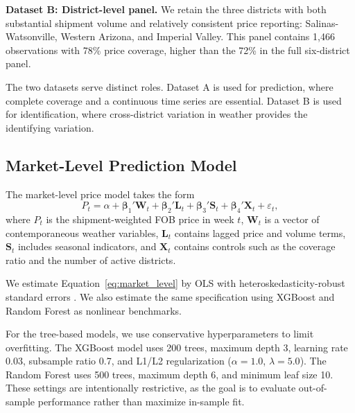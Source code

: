 \documentclass[12pt]{article}
\begin{document}
\textbf{Dataset B: District-level panel.} We retain the three districts with both substantial shipment volume and relatively consistent price reporting: Salinas-Watsonville, Western Arizona, and Imperial Valley. This panel contains 1,466 observations with 78\% price coverage, higher than the 72\% in the full six-district panel.

The two datasets serve distinct roles. Dataset A is used for prediction, where complete coverage and a continuous time series are essential. Dataset B is used for identification, where cross-district variation in weather provides the identifying variation.

\subsection{Market-Level Prediction Model}
\label{subsec:market_model}

The market-level price model takes the form
\begin{equation}
\label{eq:market_level}
P_t = \alpha + \boldsymbol{\beta}_1' \mathbf{W}_t + \boldsymbol{\beta}_2' \mathbf{L}_t + \boldsymbol{\beta}_3' \mathbf{S}_t + \boldsymbol{\beta}_4' \mathbf{X}_t + \varepsilon_t,
\end{equation}
where $P_t$ is the shipment-weighted FOB price in week $t$, $\mathbf{W}_t$ is a vector of contemporaneous weather variables, $\mathbf{L}_t$ contains lagged price and volume terms, $\mathbf{S}_t$ includes seasonal indicators, and $\mathbf{X}_t$ contains controls such as the coverage ratio and the number of active districts.

We estimate Equation~\eqref{eq:market_level} by OLS with heteroskedasticity-robust standard errors \citep{white1980heteroskedasticity}. We also estimate the same specification using XGBoost \citep{chen2016xgboost} and Random Forest \citep{breiman2001random} as nonlinear benchmarks.

For the tree-based models, we use conservative hyperparameters to limit overfitting. The XGBoost model uses 200 trees, maximum depth 3, learning rate 0.03, subsample ratio 0.7, and L1/L2 regularization ($\alpha = 1.0$, $\lambda = 5.0$). The Random Forest uses 500 trees, maximum depth 6, and minimum leaf size 10. These settings are intentionally restrictive, as the goal is to evaluate out-of-sample performance rather than maximize in-sample fit.
\end{document}
